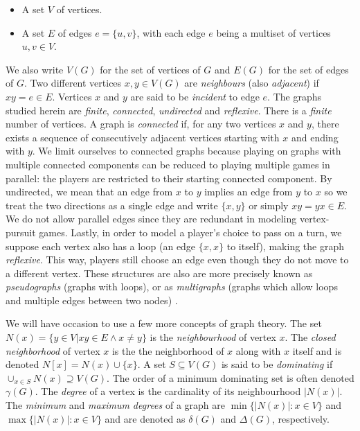 \begin{itemize}
\item A set $V$ of vertices.
\item A set $E$ of edges $e = \{u,v\}$, with each edge $e$ being a multiset of vertices $u, v \in V$.
\end{itemize}

We also write $V(G)$ for the set of vertices of $G$ and $E(G)$ for the set of edges of $G$.
 Two different vertices $x, y \in V(G)$ are \textit{neighbours} (also \textit{adjacent}) if $xy = e \in E$. Vertices $x$ and $y$ are said to be \textit{incident} to edge $e$.
The graphs studied herein are \textit{finite}, \textit{connected}, \textit{undirected} and \textit{reflexive}.
There is a \textit{finite} number of vertices. A graph is \textit{connected} if, for any two vertices $x$ and $y$, there exists a sequence of consecutively adjacent vertices starting with $x$ and ending with $y$.
We limit ourselves to connected graphs because playing on graphs with multiple connected components can be reduced to playing multiple games in parallel: the players are restricted to their starting connected component. By undirected, we mean that an edge from $x$ to $y$ implies an edge from $y$ to $x$ so we treat the two directions as a single edge and write $\{x,y\}$ or simply $xy = yx \in E$. We do not allow parallel edges since they are redundant in modeling vertex-pursuit games.
Lastly, in order to model a player's choice to pass on a turn, we suppose each vertex also has a loop (an edge $\{x,x\}$ to itself), making the graph \textit{reflexive}. This way, players still choose an edge even though they do not move to a different vertex.  These structures are also are more precisely known as \textit{pseudographs} (graphs with loops), or as \textit{multigraphs} (graphs which allow loops and multiple edges between two nodes)  \cite{bollobas2013modern}.

We will have occasion to use a few more concepts of graph theory.
The set $N(x) = \{ y \in V | xy \in E \land x \neq y\}$ is the \textit{neighbourhood} of vertex $x$.
The \textit{closed neighborhood} of vertex $x$ is the the neighborhood of $x$ along with $x$ itself and is denoted $N[x] = N(x) \cup \{x\}$. A set $S \subseteq V(G)$ is said to be \textit{dominating} if $\cup_{x\in S} N(x) \supseteq V(G)$. The order of a minimum dominating set is often denoted $\gamma(G)$. The \textit{degree} of a vertex is the cardinality of its neighbourhood $\lvert N(x) \rvert$. The \textit{minimum} and \textit{maximum degrees} of a graph are $\min\{ \lvert N(x)\rvert : x \in V\}$ and $\max \{ \lvert N(x)\rvert : x \in V\}$ and are denoted as $\delta(G)$ and $\Delta(G)$, respectively.

